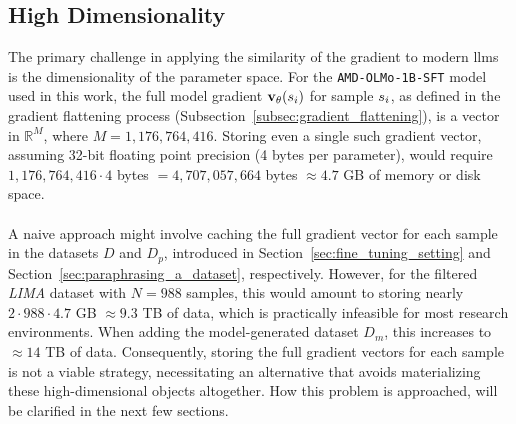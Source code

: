 \subsection{High Dimensionality}\label{subsec:high_dimensionality}
The primary challenge in applying the similarity of the gradient to modern \acrlong{llm}s is the dimensionality of the parameter space. For the \texttt{AMD-OLMo-1B-SFT} model used in this work, the full model gradient $\vXsi[\theta]$ for sample $\si$, as defined in the gradient flattening process (Subsection~\ref{subsec:gradient_flattening}), is a vector in $\mathbb{R}^{M}$, where $M = 1{,}176{,}764{,}416$. Storing even a single such gradient vector, assuming 32-bit floating point precision (4 bytes per parameter), would require $1{,}176{,}764{,}416 \cdot 4$ bytes $= 4{,}707{,}057{,}664$ bytes $\approx 4.7$ GB of memory or disk space.
\\\\
A naive approach might involve caching the full gradient vector for each sample in the datasets $D$ and $D_p$, introduced in Section~\ref{sec:fine_tuning_setting} and Section~\ref{sec:paraphrasing_a_dataset}, respectively. However, for the filtered \emph{LIMA} dataset with $N=988$ samples, this would amount to storing nearly $2 \cdot 988 \cdot 4.7$ GB $\approx 9.3$ TB of data, which is practically infeasible for most research environments. When adding the model-generated dataset $D_m$, this increases to $\approx 14$ TB of data. Consequently, storing the full gradient vectors for each sample is not a viable strategy, necessitating an alternative that avoids materializing these high-dimensional objects altogether. How this problem is approached, will be clarified in the next few sections.

